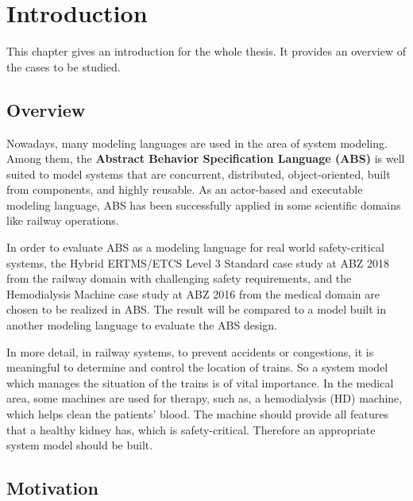 \documentclass[article,dr=phil,type=msc,colorback,accentcolor=tud9c]{tudthesis}
\begin{document}
  {}
  \author{Chunyuan Yu}
  \makethesistitle
  
  \section{Introduction}
  
  This chapter gives an introduction for the whole thesis. It provides an overview of the cases to be studied.
  
  \subsection{Overview}
  
  Nowadays, many modeling languages are used in the area of system modeling. Among them, the \textbf{Abstract Behavior Specification Language (ABS)} is well suited to model systems that are concurrent, distributed, object-oriented, built from components, and highly reusable.\cite{hahnle2012abstract} As an actor-based and executable modeling language, ABS has been successfully applied in some scientific domains like railway operations.\cite{kamburjan2016uniform}
  
  In order to evaluate ABS as a modeling language for real world safety-critical systems, the Hybrid ERTMS/ETCS Level 3 Standard case study at ABZ 2018 from the railway domain with challenging safety requirements, and the Hemodialysis Machine case study at ABZ 2016 from the medical domain are chosen to be realized in ABS. The result will be compared to a model built in another modeling language to evaluate the ABS design.
  
  In more detail, in railway systems, to prevent accidents or congestions, it is meaningful to determine and control the location of trains. \cite{de2014automatic} So a system model which manages the situation of the trains is of vital importance. \cite{lu2004modeling} In the medical area, some machines are used for therapy, such as, a hemodialysis (HD) machine, which helps clean the patients' blood. The machine should provide all features that a healthy kidney has, which is safety-critical. Therefore an appropriate system model should be built.
  
  \subsection{Motivation}
  
\end{document}
